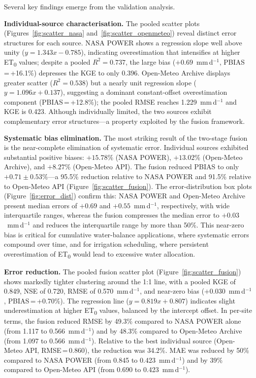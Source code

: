 \documentclass[preprint,review,12pt]{elsarticle}
\begin{document}
Several key findings emerge from the validation analysis.

\textbf{Individual-source characterisation.}
The pooled scatter plots (Figures~\ref{fig:scatter_nasa}
and~\ref{fig:scatter_openmeteo}) reveal distinct error structures for
each source. NASA POWER shows a regression slope well above unity
($y = 1.343x - 0.785$), indicating overestimation that intensifies at
higher ET\textsubscript{0} values; despite a pooled $R^2 = 0.737$, the
large bias ($+0.69$~mm\,d$^{-1}$, PBIAS\,=\,+16.1\%) depresses the
KGE to only 0.396. Open-Meteo Archive displays greater scatter
($R^2 = 0.538$) but a nearly unit regression slope
($y = 1.096x + 0.137$), suggesting a dominant constant-offset
overestimation component (PBIAS\,=\,+12.8\%); the pooled RMSE reaches
1.229~mm\,d$^{-1}$ and KGE is 0.423. Although individually limited,
the two sources exhibit complementary error structures---a property
exploited by the fusion framework.

\textbf{Systematic bias elimination.}
The most striking result of the
two-stage fusion is the near-complete elimination of systematic error.
Individual sources exhibited substantial positive biases: $+15.78\%$
(NASA POWER), $+13.02\%$ (Open-Meteo Archive), and $+8.27\%$ (Open-Meteo
API). The fusion reduced PBIAS to only $+0.71 \pm 0.53\%$---a 95.5\%
reduction relative to NASA POWER and 91.5\% relative to Open-Meteo API
(Figure~\ref{fig:scatter_fusion}). The error-distribution box
plots (Figure~\ref{fig:error_dist}) confirm this: NASA POWER and
Open-Meteo Archive present median errors of $+0.69$ and
$+0.55$~mm\,d$^{-1}$, respectively, with wide interquartile ranges,
whereas the fusion compresses the median error to
$+0.03$~mm\,d$^{-1}$ and reduces the interquartile range by more than
50\%. This near-zero bias is critical for cumulative water-balance
applications, where systematic errors compound over time, and for
irrigation scheduling, where persistent overestimation of
ET\textsubscript{0} would lead to excessive water allocation.

\textbf{Error reduction.}
The pooled fusion scatter plot (Figure~\ref{fig:scatter_fusion})
shows markedly tighter clustering around the 1:1 line, with a pooled
KGE of 0.849, NSE of 0.720, RMSE of 0.570~mm\,d$^{-1}$, and near-zero
bias ($+0.030$~mm\,d$^{-1}$, PBIAS\,=\,+0.70\%). The regression line
($y = 0.819x + 0.807$) indicates slight underestimation at higher
ET\textsubscript{0} values, balanced by the intercept offset. In
per-site terms, the fusion reduced RMSE by 49.3\% compared to
NASA POWER alone (from 1.117 to 0.566~mm\,d$^{-1}$) and by 48.3\%
compared to Open-Meteo Archive (from 1.097 to 0.566~mm\,d$^{-1}$).
Relative to the best individual source (Open-Meteo API, RMSE\,=\,0.860),
the reduction was 34.2\%. MAE was reduced by 50\% compared to NASA POWER
(from 0.845 to 0.423~mm\,d$^{-1}$) and by 39\% compared to Open-Meteo
API (from 0.690 to 0.423~mm\,d$^{-1}$).
\end{document}
